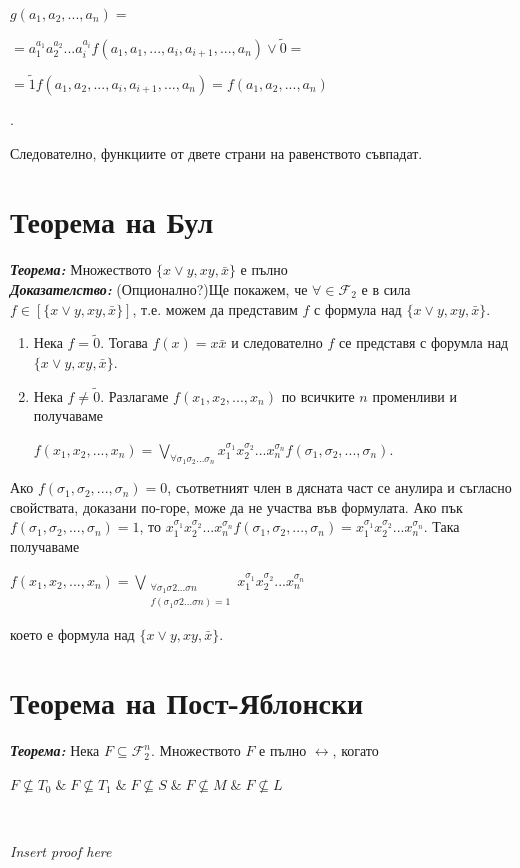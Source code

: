 \documentclass[11pt]{article} %
\newcommand{\italicBold}[1]{\textbf{\emph{#1}}}
\newcommand{\theorem}{\italicBold{Теорема: }}
\newcommand{\proof}{\italicBold{Доказателство: }}
\newcommand{\curlies}[1]{\{#1\}}
\newcommand{\enumNum}{\renewcommand{\theenumi}{\arabic{enumi}}}
\begin{document}
\centerline{$g(a_{1}, a_{2}, ..., a_{n}) = $}
\centerline{$ = a_{1}^{a_1} a_{2}^{a_2} ... a_{i}^{a_i} f(a_{1}, a_{1}, ..., a_{i}, a_{i+1}, ..., a_{n})\vee \tilde{0} = $}
\centerline{$ = \tilde{1}f(a_{1}, a_{2}, ..., a_{i}, a_{i+1},..., a_{n}) = f(a_{1}, a_{2}, ..., a_{n})$}.

Следователно, функциите от двете страни на равенството съвпадат.

\section{Теорема на Бул}
\theorem Множеството $\curlies{x \vee y, xy, \bar{x}}$ е пълно\\

\proof (Опционално?)Ще покажем, че $\forall \in \mathcal{F}_{2}$ е в сила $f \in [\curlies{x \vee y, xy, \bar{x}}]$, т.е. можем да представим $f$ с формула над $\curlies{x \vee y, xy, \bar{x}}$.

\enumNum
\begin{enumerate}
	\item Нека $f = \tilde{0}$. Тогава $f(x) = x\bar{x}$ и следователно $f$ се представя с форумла над $\curlies{x \vee y, xy, \bar{x}}$. \\
	\item Нека $f \neq \tilde{0}$. Разлагаме $f(x_{1}, x_{2}, ..., x_{n})$ по всичките $n$ променливи и получаваме \\
		\centerline{$f(x_{1}, x_{2}, ..., x_{n}) = \underset{\forall \sigma_{1}\sigma_{2}...\sigma_{n}}{\bigvee}x_{1}^{\sigma_1} x_{2}^{\sigma_2} ... x_{n}^{\sigma_n} f(\sigma_{1}, \sigma_{2}, ..., \sigma_{n})$.}
\end{enumerate}

Ако $f(\sigma_{1}, \sigma_{2}, ..., \sigma_{n}) = 0$, съответният член в дясната част се анулира и съгласно свойствата, доказани по-горе, може да не участва във формулата. Ако пък $f(\sigma_{1}, \sigma_{2}, ..., \sigma_{n}) = 1$, то $x_{1}^{\sigma_1}x_{2}^{\sigma_2}... x_{n}^{\sigma_n} f(\sigma_{1}, \sigma_{2}, ..., \sigma_{n}) = x_{1}^{\sigma_1}x_{2}^{\sigma_2}... x_{n}^{\sigma_n}$. Така получаваме \\ 

\centerline{$f(x_{1}, x_{2}, ..., x_{n}) =   \bigvee_{\substack{\forall \sigma_{1} \sigma{2}...\sigma{n} \\ f(\sigma_{1} \sigma{2}...\sigma{n}) = 1}} x_{1}^{\sigma_1}x_{2}^{\sigma_2}...x_{n}^{\sigma_n}$}

което е формула над $\curlies{x \vee y, xy, \bar{x}}$.

\section{Теорема на Пост-Яблонски}
\theorem Нека $F \subseteq \mathcal{F}^{n}_{2}$. Множеството $F$ е пълно $\leftrightarrow$, когато \\
\centerline{$F\not\subseteq T_{0}\;\&\;F \not\subseteq T_{1}\;\&\;F \not\subseteq S\;\&\;F \not\subseteq M\;\&\;F \not\subseteq L$}\\
\centerline{\textit{Insert proof here}}
\end{document}
